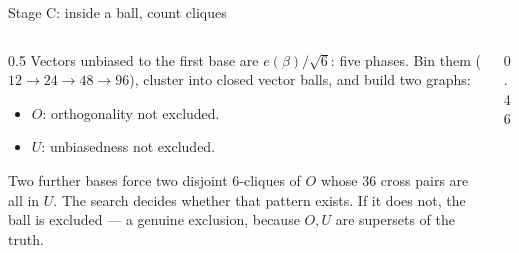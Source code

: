 \documentclass[aspectratio=169,10pt]{beamer}
\begin{document}
\begin{frame}{Stage C: inside a ball, count cliques}
  \begin{columns}[T]
  \begin{column}{0.5\textwidth}
    \small
    Vectors unbiased to the first base are $e(\beta)/\sqrt6$: five phases. Bin them
    ($12\to24\to48\to96$), cluster into closed vector balls, and build two graphs:
    \medskip

    \begin{itemize}
      \item $O$: orthogonality not excluded.
      \item $U$: unbiasedness not excluded.
    \end{itemize}
    \medskip
    Two further bases force two disjoint $6$-cliques of $O$ whose $36$ cross pairs are all in $U$.
    The search decides whether that pattern exists. If it does not, the ball is excluded ---
    a genuine exclusion, because $O,U$ are supersets of the truth.
  \end{column}
  \begin{column}{0.46\textwidth}
    \centering
  \end{column}
  \end{columns}
\end{frame}
\end{document}
